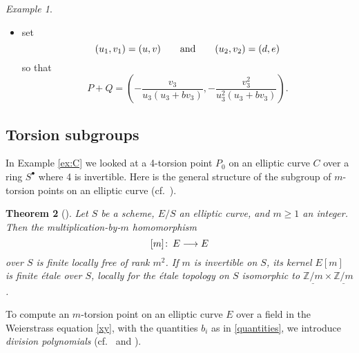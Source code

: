 \documentclass{gtpart}
\newtheorem{thm}{Theorem}
\theoremstyle{definition}
\theoremstyle{remark}
\newtheorem{ex}[thm]{Example}
\def\co{\colon\thinspace}
\newcommand{\mb}[1]{\mathbb{#1}}
\newcommand{\BZ}{{\mb Z}}
\newcommand{\ad}{{\rm and}}
\newcommand{\s}{S^\bullet}
\numberwithin{equation}{section}
\numberwithin{thm}{section}
\begin{document}
\begin{ex}
\begin{itemize}
  \item set 
  \[
   (u_1,v_1) = (u,v) \qquad \ad \qquad (u_2,v_2) = (d,e) 
  \]
  so that 
  \[
   P + Q = \left( -\frac{v_3}{u_3 (u_3 + b v_3)}, 
   -\frac{v_3^2}{u_3^2 (u_3 + b v_3)} \right).  
  \]
 \end{itemize}
\end{ex}


\subsection{Torsion subgroups}
\label{subsec:tors}

In Example \ref{ex:C} we looked at a 4-torsion point $P_0$ on an 
elliptic curve $C$ over a ring $\s$ where 4 is invertible.  Here is the 
general structure of the subgroup of $m$-torsion points on an elliptic 
curve (cf.~\cite[2.3.2 and 12.2.6]{KM}).  

\begin{thm}[{\cite[2.3.1]{KM}}]
\label{thm:tors}
 Let $S$ be a scheme, $E/S$ an elliptic curve, and $m \geq 1$ an integer.  
 Then the {\em multiplication-by-$m$} homomorphism 
 \[
  [m] \co E \longrightarrow E 
 \]
 over $S$ is finite locally free of rank $m^2$.  If $m$ is invertible on 
 $S$, its kernel $E[m]$ is finite \'etale over $S$, locally for the 
 \'etale topology on $S$ isomorphic to 
 $\underline{\BZ/m} \times \underline{\BZ/m}$.  
\end{thm}

To compute an $m$-torsion point on an elliptic curve $E$ over a field in 
the Weierstrass equation \eqref{xy}, with the quantities $b_i$ as in 
\eqref{quantities}, we introduce {\em division polynomials} 
(cf.~\cite[Exercise 3.7]{AEC} and \cite[13(9.2-4)]{husemoller}).  
\end{document}
